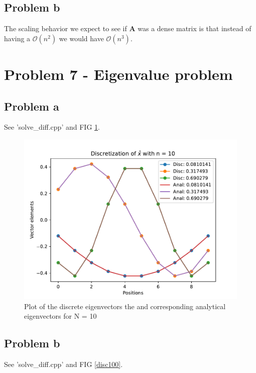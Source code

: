 \documentclass[english,notitlepage]{revtex4-1}  %
\begin{document}
\subsection*{Problem b}
The scaling behavior we expect to see if $\mathbf{A}$ was a dense matrix is that instead of having a $\mathcal{O}(n^2)$ we would have $\mathcal{O}(n^3)$.


\section*{Problem 7 - Eigenvalue problem}

\subsection*{Problem a}
See 'solve\_diff.cpp' and FIG \ref{disc10}.

\begin{figure}[H]
	\centering
	\includegraphics[scale=0.55]{plots/discretization_n10.pdf} %
	\caption{Plot of the discrete eigenvectors the and corresponding analytical eigenvectors for N = 10}
	\label{disc10}
\end{figure}

\subsection*{Problem b}
See 'solve\_diff.cpp' and FIG \ref{disc100}.
\end{document}

